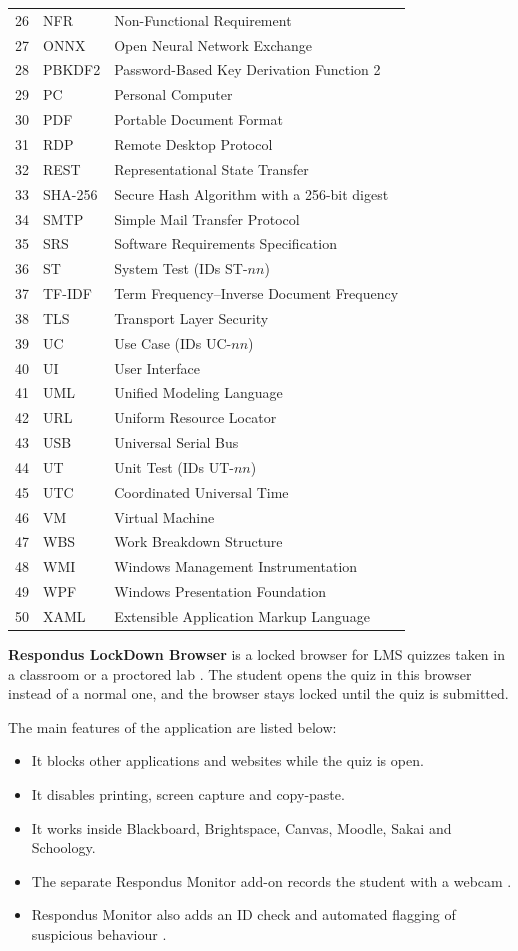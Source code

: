 \begin{longtable}{cl>{\raggedright\arraybackslash}p{9.6cm}}
26 & NFR & Non-Functional Requirement \\
27 & ONNX & Open Neural Network Exchange \\
28 & PBKDF2 & Password-Based Key Derivation Function 2 \\
29 & PC & Personal Computer \\
30 & PDF & Portable Document Format \\
31 & RDP & Remote Desktop Protocol \\
32 & REST & Representational State Transfer \\
33 & SHA-256 & Secure Hash Algorithm with a 256-bit digest \\
34 & SMTP & Simple Mail Transfer Protocol \\
35 & SRS & Software Requirements Specification \\
36 & ST & System Test (IDs ST-$nn$) \\
37 & TF-IDF & Term Frequency--Inverse Document Frequency \\
38 & TLS & Transport Layer Security \\
39 & UC & Use Case (IDs UC-$nn$) \\
40 & UI & User Interface \\
41 & UML & Unified Modeling Language \\
42 & URL & Uniform Resource Locator \\
43 & USB & Universal Serial Bus \\
44 & UT & Unit Test (IDs UT-$nn$) \\
45 & UTC & Coordinated Universal Time \\
46 & VM & Virtual Machine \\
47 & WBS & Work Breakdown Structure \\
48 & WMI & Windows Management Instrumentation \\
49 & WPF & Windows Presentation Foundation \\
50 & XAML & Extensible Application Markup Language \\
\end{longtable}

\noindent\textbf{Respondus LockDown Browser} is a locked browser for LMS quizzes taken in a classroom or a proctored lab \cite{respondus1}. The student opens the quiz in this browser instead of a normal one, and the browser stays locked until the quiz is submitted.

\noindent The main features of the application are listed below:
\begin{itemize}[noitemsep]
\item It blocks other applications and websites while the quiz is open.
\item It disables printing, screen capture and copy-paste.
\item It works inside Blackboard, Brightspace, Canvas, Moodle, Sakai and Schoology.
\item The separate Respondus Monitor add-on records the student with a webcam \cite{respondus_monitor}.
\item Respondus Monitor also adds an ID check and automated flagging of suspicious behaviour \cite{respondus_webcam}.
\end{itemize}

